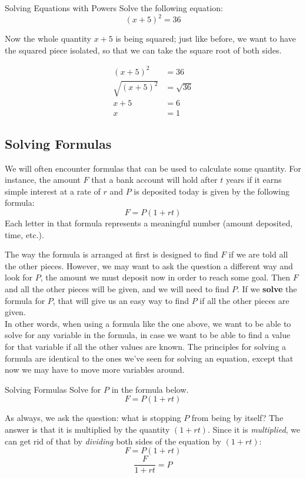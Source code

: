 \begin{example}{Solving Equations with Powers}
Solve the following equation:
\[(x+5)^2 = 36\]

\sol
Now the whole quantity $x+5$ is being squared; just like before, we want to have the squared piece isolated, so that we can take the square root of both sides.

\begin{align*}
(x+5)^2 &= 36\\
\sqrt{(x+5)^2} &= \sqrt{36}\\
x+5 &= 6\\
x &= \boxed{1}
\end{align*}
\end{example}

\subsection{Solving Formulas}

We will often encounter formulas that can be used to calculate some quantity.  For instance, the amount $F$ that a bank account will hold after $t$ years if it earns simple interest at a rate of $r$ and $P$ is deposited today is given by the following formula: \[F = P(1+rt)\]  Each letter in that formula represents a meaningful number (amount deposited, time, etc.).

The way the formula is arranged at first is designed to find $F$ if we are told all the other pieces.  However, we may want to ask the question a different way and look for $P$, the amount we must deposit now in order to reach some goal.  Then $F$ and all the other pieces will be given, and we will need to find $P$.  If we \textbf{solve} the formula for $P$, that will give us an easy way to find $P$ if all the other pieces are given.\\

In other words, when using a formula like the one above, we want to be able to solve for any variable in the formula, in case we want to be able to find a value for that variable if all the other values are known.  The principles for solving a formula are identical to the ones we've seen for solving an equation, except that now we may have to move more variables around.

\begin{example}{Solving Formulas}
Solve for $P$ in the formula below.
\[F = P(1+rt)\]

\sol
As always, we ask the question: what is stopping $P$ from being by itself?  The answer is that it is multiplied by the quantity $(1+rt)$.  Since it is \emph{multiplied}, we can get rid of that by \emph{dividing} both sides of the equation by $(1+rt)$:
\[F = P(1+rt)\]
\[\boxed{\dfrac{F}{1+rt} = P}\]
\end{example}
\pagebreak

